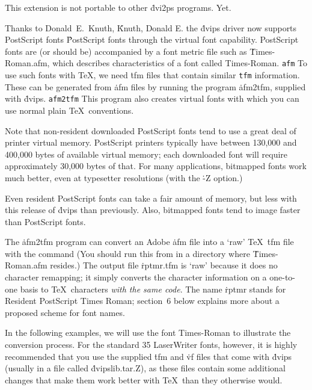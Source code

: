 This extension is not portable to other \.{dvi2ps} programs.  Yet.


Thanks to Donald~E.~Knuth,
\^{Knuth, Donald E.}
the \.{dvips} driver now supports PostScript fonts
\^{PostScript fonts}
through the virtual font capability.
PostScript fonts are (or should be) accompanied by a font metric file
such as \.{Times-Roman.afm},
which describes characteristics of a font called Times-Roman.
\^{{\tt afm}}
To use such fonts with \TeX, we need \.{tfm} files that contain similar
\^{{\tt tfm}}
information. These can be generated from \.{afm} files
by running the program \.{afm2tfm}, supplied with \.{dvips}.
\^{{\tt afm2tfm}}
This program also creates virtual fonts with which you can use normal
plain \TeX\ conventions.

Note that non-resident downloaded PostScript fonts tend to use a
great deal of printer virtual memory.  PostScript printers typically
have between 130,000 and 400,000 bytes of available virtual memory;
each downloaded font will require approximately 30,000 bytes of
that.  For many applications, bitmapped fonts work much better,
even at typesetter resolutions (with the \.{-Z} option.)

Even resident PostScript fonts can take a fair amount of memory,
but less with this release of \.{dvips} than previously.  Also,
bitmapped fonts tend to image faster than PostScript fonts.


The \.{afm2tfm} program can convert an Adobe \.{afm} file into a `raw'
\TeX\ \.{tfm} file with the command
\noindent
(You should run this from in a directory where \.{Times-Roman.afm} resides.)
The output file \.{rptmr.tfm} is `raw' because it does no character remapping;
it simply converts the character information on a one-to-one basis to \TeX\
characters {\it with the same code}. The name \.{rptmr} stands for
Resident PostScript Times Roman; section~6 below explains more about
a proposed scheme for font names.

In the following examples, we will use the font Times-Roman to
illustrate the conversion process.  For the standard 35 LaserWriter
fonts, however, it is highly recommended that you use the supplied
\.{tfm} and \.{vf} files that come with \.{dvips} (usually in a
file called \.{dvipslib.tar.Z}), as these files contain some additional
changes that make them work better with \TeX\ than they otherwise
would.

